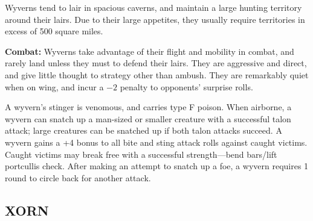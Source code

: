 \begin{multicols}{2}
Wyverns tend to lair in spacious caverns, and maintain a large hunting territory around their lairs. Due to their large appetites, they usually require territories in excess of 500 square miles.

\textbf{Combat:} Wyverns take advantage of their flight and mobility in combat, and rarely land unless they must to defend their lairs. They are aggressive and direct, and give little thought to strategy other than ambush. They are remarkably quiet when on wing, and incur a $-2$ penalty to opponents' surprise rolls.

A wyvern's stinger is venomous, and carries type F poison. When airborne, a wyvern can snatch up a man-sized or smaller creature with a successful talon attack; large creatures can be snatched up if both talon attacks succeed. A wyvern gains a +4 bonus to all bite and sting attack rolls against caught victims. Caught victims may break free with a successful strength---bend bars/lift portcullis check. After making an attempt to snatch up a foe, a wyvern requires 1 round to circle back for another attack.

\noindent
\begin{minipage}{\columnwidth}

\vspace{1em}

\subsection{XORN}


\end{minipage}
\end{multicols}
